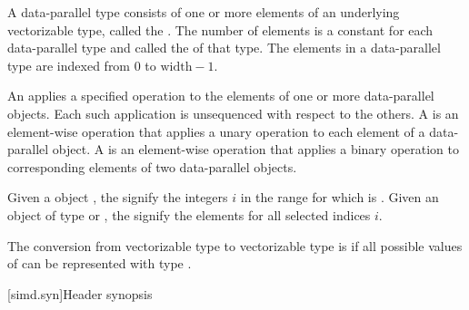 \pnum
A data-parallel type consists of one or more elements of an underlying vectorizable type,
called the .
The number of elements is a constant for each data-parallel type and called the
 of that type.
The elements in a data-parallel type are indexed from 0 to $\textrm{width} - 1$.

\pnum
An  applies a specified operation to the elements of one or more data-parallel objects. Each such application is unsequenced with respect to the others. A  is an element-wise operation that applies a unary operation to each element of a data-parallel object. A  is an element-wise operation that applies a binary operation to corresponding elements of two data-parallel objects.

\pnum\label{wording.selected.indices}%
Given a  object , the
 signify the integers $i$ in the range \tcode{[0,
mask.size())} for which  is .
Given an object  of type  or ,
the  signify the elements  for all selected indices $i$.

\pnum
The conversion from vectorizable type  to vectorizable type  is  if
all possible values of  can be represented with type .

[simd.syn]{Header \texorpdfstring{}{<simd>} synopsis}


